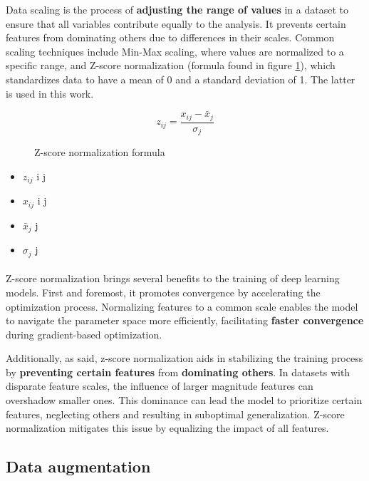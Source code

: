 Data scaling is the process of \textbf{adjusting the range of values} in a dataset to ensure that all variables contribute equally to the analysis. It prevents certain features from dominating others due to differences in their scales. Common scaling techniques include Min-Max scaling, where values are normalized to a specific range, and Z-score normalization (formula found in figure \ref{eq:standardization}), which standardizes data to have a mean of 0 and a standard deviation of 1. The latter is used in this work.

\begin{figure}
\[ z_{ij} = \frac{{x_{ij} - \bar{x}_j}}{{\sigma_j}} \]
\caption{Z-score normalization formula}
\label{eq:standardization}
\end{figure}
\begin{itemize}[noitemsep, leftmargin=*]
  \item[] $z_{ij}$  i j
  \item[] $x_{ij}$  i j 
  \item[] $\bar{x}_j$  j 
  \item[] $\sigma_j$  j
\end{itemize}


\paragraph{}Z-score normalization brings several benefits to the training of deep learning models. First and foremost, it promotes convergence by accelerating the optimization process. Normalizing features to a common scale enables the model to navigate the parameter space more efficiently, facilitating \textbf{faster convergence} during gradient-based optimization.

Additionally, as said, z-score normalization aids in stabilizing the training process by \textbf{preventing certain features }from\textbf{ dominating others}. In datasets with disparate feature scales, the influence of larger magnitude features can overshadow smaller ones. This dominance can lead the model to prioritize certain features, neglecting others and resulting in suboptimal generalization. Z-score normalization mitigates this issue by equalizing the impact of all features.

\subsection{Data augmentation}
\label{subsec:data-augmentation}

